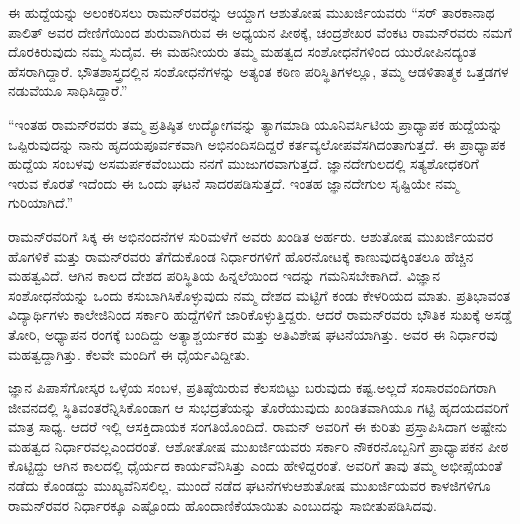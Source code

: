 ಈ ಹುದ್ದೆಯನ್ನು ಅಲಂಕರಿಸಲು ರಾಮನ್‍ರವರನ್ನು ಆಯ್ದಾಗ ಆಶುತೋಷ ಮುಖರ್ಜಿಯವರು \enginline{-} “ಸರ್ ತಾರಕಾನಾಥ ಪಾಲಿತ್ ಅವರ ದೇಣಿಗೆಯಿಂದ ಶುರುವಾಗಿರುವ ಈ ಅಧ್ಯಯನ ಪೀಠಕ್ಕೆ, ಚಂದ್ರಶೇಖರ ವೆಂಕಟ ರಾಮನ್‍ರವರು ನಮಗೆ ದೊರಕಿರುವುದು ನಮ್ಮ ಸುದೈವ. ಈ ಮಹನೀಯರು ತಮ್ಮ ಮಹತ್ವದ ಸಂಶೋಧನೆಗಳಿಂದ ಯುರೋಪಿನದ್ಯಂತ ಹೆಸರಾಗಿದ್ದಾರೆ. ಭೌತಶಾಸ್ತ್ರದಲ್ಲಿನ ಸಂಶೋಧನೆಗಳನ್ನು ಅತ್ಯಂತ ಕಠಿಣ ಪರಿಸ್ಥಿತಿಗಳಲ್ಲೂ, ತಮ್ಮ ಆಡಳಿತಾತ್ಮಕ ಒತ್ತಡಗಳ ನಡುವೆಯೂ ಸಾಧಿಸಿದ್ದಾರೆ.”

“ಇಂತಹ ರಾಮನ್‍ರವರು ತಮ್ಮ ಪ್ರತಿಷ್ಠಿತ ಉದ್ಯೋಗವನ್ನು ತ್ಯಾಗಮಾಡಿ ಯೂನಿವರ್ಸಿಟಿಯ ಪ್ರಾಧ್ಯಾಪಕ ಹುದ್ದೆಯನ್ನು ಒಪ್ಪಿರುವುದನ್ನು ನಾನು ಹೃದಯಪೂರ್ವಕವಾಗಿ ಅಭಿನಂದಿಸದಿದ್ದರೆ ಕರ್ತವ್ಯಲೋಪವೆಸಗಿದಂತಾಗುತ್ತದೆ. ಈ ಪ್ರಾಧ್ಯಾಪಕ ಹುದ್ದೆಯ ಸಂಬಳವು ಅಸಮರ್ಪಕವೆಂಬುದು ನನಗೆ ಮುಜುಗರವಾಗುತ್ತದೆ. ಜ್ಞಾನದೇಗುಲದಲ್ಲಿ ಸತ್ಯಶೋಧಕರಿಗೆ ಇರುವ ಕೊರತೆ ಇದೆಂದು ಈ ಒಂದು ಘಟನೆ ಸಾದರಪಡಿಸುತ್ತದೆ. ಇಂತಹ ಜ್ಞಾನದೇಗುಲ ಸೃಷ್ಟಿಯೇ ನಮ್ಮ ಗುರಿಯಾಗಿದೆ.”

ರಾಮನ್‍ರವರಿಗೆ ಸಿಕ್ಕ ಈ ಅಭಿನಂದನೆಗಳ ಸುರಿಮಳೆಗೆ ಅವರು ಖಂಡಿತ ಅರ್ಹರು. ಆಶುತೋಷ ಮುಖರ್ಜಿಯವರ ಹೊಗಳಿಕೆ ಮತ್ತು ರಾಮನ್‍ರವರು ತೆಗೆದುಕೊಂಡ ನಿರ್ಧಾರಗಳಿಗೆ ಹೊರನೋಟಕ್ಕೆ ಕಾಣುವುದಕ್ಕಿಂತಲೂ ಹೆಚ್ಚಿನ ಮಹತ್ವವಿದೆ. ಆಗಿನ ಕಾಲದ ದೇಶದ ಪರಿಸ್ಥಿತಿಯ ಹಿನ್ನಲೆಯಿಂದ ಇದನ್ನು ಗಮನಿಸಬೇಕಾಗಿದೆ. ವಿಜ್ಞಾನ ಸಂಶೋಧನೆಯನ್ನು ಒಂದು ಕಸುಬಾಗಿಸಿಕೊಳ್ಳುವುದು ನಮ್ಮ ದೇಶದ ಮಟ್ಟಿಗೆ ಕಂಡು ಕೇಳರಿಯದ ಮಾತು. ಪ್ರತಿಭಾವಂತ ವಿದ್ಯಾರ್ಥಿಗಳು ಕಾಲೇಜಿನಿಂದ ಸರ್ಕಾರಿ ಹುದ್ದೆಗಳಿಗೆ ಜಾರಿಕೊಳ್ಳುತ್ತಿದ್ದರು. ಆದರೆ ರಾಮನ್‍ರವರು ಭೌತಿಕ ಸುಖಕ್ಕೆ ಅಸಡ್ಡೆ ತೋರಿ, ಅಧ್ಯಾಪನ ರಂಗಕ್ಕೆ ಬಂದಿದ್ದು ಅತ್ಯಾಶ್ಚರ್ಯಕರ ಮತ್ತು ಅತಿವಿಶೇಷ ಘಟನೆಯಾಗಿತ್ತು. ಅವರ ಈ ನಿರ್ಧಾರವು ಮಹತ್ವದ್ದಾಗಿತ್ತು. ಕೆಲವೇ ಮಂದಿಗೆ ಈ ಧೈರ್ಯವಿದ್ದೀತು.

ಜ್ಞಾನ ಪಿಪಾಸೆಗೋಸ್ಕರ ಒಳ್ಳೆಯ ಸಂಬಳ, ಪ್ರತಿಷ್ಠೆಯಿರುವ ಕೆಲಸಬಿಟ್ಟು ಬರುವುದು ಕಷ್ಟ.\break ಅಲ್ಲದೆ ಸಂಸಾರವಂದಿಗರಾಗಿ ಜೀವನದಲ್ಲಿ ಸ್ಥಿತಿವಂತರೆನ್ನಿಸಿಕೊಂಡಾಗ ಆ ಸುಭದ್ರತೆಯನ್ನು ತೊರೆಯುವುದು ಖಂಡಿತವಾಗಿಯೂ ಗಟ್ಟಿ ಹೃದಯದವರಿಗೆ ಮಾತ್ರ ಸಾಧ್ಯ. ಆದರೆ ಇಲ್ಲಿ ಆಸಕ್ತಿದಾಯಕ ಸಂಗತಿಯೊಂದಿದೆ. ರಾಮನ್ ಅವರಿಗೆ ಈ ಕುರಿತು ಪ್ರಸ್ತಾಪಿಸಿದಾಗ ಅಷ್ಟೇನು ಮಹತ್ವದ ನಿರ್ಧಾರವಲ್ಲ\break ಎಂದರಂತೆ. ಆಶೋತೋಷ ಮುಖರ್ಜಿಯವರು ಸರ್ಕಾರಿ ನೌಕರನೊಬ್ಬನಿಗೆ ಪ್ರಾಧ್ಯಾಪಕನ ಪೀಠ ಕೊಟ್ಟಿದ್ದು ಆಗಿನ ಕಾಲದಲ್ಲಿ ಧೈರ್ಯದ ಕಾರ್ಯವೆನಿಸಿತ್ತು ಎಂದು ಹೇಳಿದ್ದರಂತೆ. ಅವರಿಗೆ ತಾವು ತಮ್ಮ ಅಭೀಪ್ಸೆಯಂತೆ ನಡೆದು ಕೊಂಡದ್ದು ಮುಖ್ಯವೆನಿಸಲಿಲ್ಲ. ಮುಂದೆ ನಡೆದ ಘಟನೆಗಳು\break ಆಶುತೋಷ ಮುಖರ್ಜಿಯವರ ಕಾಳಜಿಗಳಿಗೂ ರಾಮನ್‍ರವರ ನಿರ್ಧಾರಕ್ಕೂ ಎಷ್ಟೊಂದು ಹೊಂದಾ\-ಣಿಕೆಯಾಯಿತು ಎಂಬುದನ್ನು ಸಾಬೀತುಪಡಿಸಿದವು.

